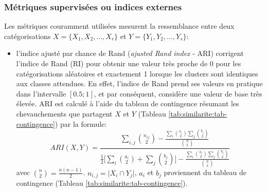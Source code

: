 \subsubsection{Métriques supervisées ou indices externes}
\label{sec:similarite:biblio:supeval}
Les métriques couramment utilisées mesurent la ressemblance entre deux catégorisations $X = \lbrace X_1, X_2,..., X_r \rbrace$ et $Y = \lbrace Y_1,Y_2,..., Y_s \rbrace$:
\begin{itemize}
	\item l'indice ajusté par chance de Rand (\textit{ajusted Rand index} - ARI) \citep{hubert1985adjustedrandidx} corrigent l'indice de Rand (RI) \citep{rand1971randidx} pour obtenir une valeur très proche de 0 pour les catégorisations aléatoires et exactement 1 lorsque les clusters sont identiques aux classes attendues. En effet, l'indice de Rand prend ses valeurs en pratique dans l'intervalle $[0.5;1]$, et par conséquent, considère une valeur de base très élevée. ARI est calculé à l'aide du tableau de contingence résumant les chevauchements que partagent $X$ et $Y$ (Tableau \ref{tab:similarite:tab-contingence}) par la formule: %
	{\footnotesize\[ARI(X,Y) = \frac{\sum\limits_{i,j}\binom{n_{ij}}{2} - \frac{\sum\limits_{i}\binom{a_{i}}{2}\sum\limits_{j}\binom{b_{j}}{2}}{\binom{N}{2}}}{\frac{1}{2}\big[\sum\limits_{i}\binom{a_{i}}{2}+\sum\limits_{j}\binom{b_{j}}{2}\big] - \frac{\sum\limits_{i}\binom{a_{i}}{2}\sum\limits_{j}\binom{b_{j}}{2}}{\binom{N}{2}}}\]} avec  $\binom{n}{2} = \frac{n(n-1)}{2}$. $n_{i,j} = \vert X_i \cap Y_j\vert$, $a_i$ et $b_j$ proviennent du tableau de contingence (Tableau \ref{tab:similarite:tab-contingence}).
	

\end{itemize}
